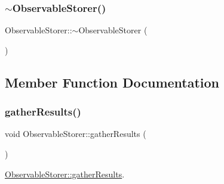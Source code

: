 \subsubsection{\texorpdfstring{$\sim$ObservableStorer()}{~ObservableStorer()}}
{\footnotesize\ttfamily Observable\+Storer\+::$\sim$\+Observable\+Storer (\begin{DoxyParamCaption}{ }\end{DoxyParamCaption})}



\subsection{Member Function Documentation}
\mbox{\label{class_observable_storer_a593f13b0dd0f9d20608ef6b84fda3f1d}} 
\subsubsection{\texorpdfstring{gatherResults()}{gatherResults()}}
{\footnotesize\ttfamily void Observable\+Storer\+::gather\+Results (\begin{DoxyParamCaption}{ }\end{DoxyParamCaption})}



\mbox{\hyperlink{class_observable_storer_a593f13b0dd0f9d20608ef6b84fda3f1d}{Observable\+Storer\+::gather\+Results}}. 

